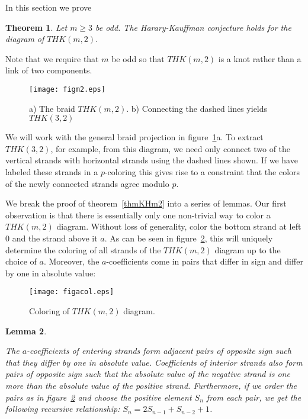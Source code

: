 \documentclass{amsart}
\newtheorem{thm}{Theorem}
\newtheorem{lemma}[thm]{Lemma}
\begin{document}
In this section we  prove

\begin{thm}
Let $m \geq 3$ be odd. The Harary-Kauffman conjecture holds for the diagram of $THK(m,2)$.
\end{thm}

\setcounter{thm}{5}

Note that we require that $m$ be odd so that $THK(m,2)$ is a knot rather than a link of two components.

\begin{figure}[ht]
\begin{center}
\texttt{[image: figm2.eps]}
\caption{a) The braid $THK(m,2)$. b) Connecting the dashed lines yields $THK(3,2)$}\label{figm2}
\end{center}
\end{figure} 

We will work with the general braid projection in figure~\ref{figm2}a.  To extract $THK(3,2)$, for example,  from this diagram, we need only connect two of the vertical strands with horizontal strands using the dashed lines shown.  If we have labeled these strands in a $p$-coloring this gives rise to a constraint that the colors of the newly connected strands agree modulo $p$.

We break the proof of theorem~\ref{thmKHm2} into a series of lemmas.
Our first observation is that there is essentially only one non-trivial way to color a $THK(m,2)$ diagram.
Without loss of generality, color the bottom strand at left $0$ and 
the strand above it $a$. As can be seen in figure~\ref{figacol}, 
this will uniquely determine the coloring of all
strands of the $THK(m,2)$ diagram up to the choice of $a$.
Moreover,
the $a$-coefficients come in pairs that differ in sign and 
differ by one in absolute value:

\begin{figure}[ht]
\begin{center}
\texttt{[image: figacol.eps]}
\caption{Coloring of $THK(m,2)$ diagram.}\label{figacol}
\end{center}
\end{figure} 

\begin{lemma} \label{lemSn}

The $a$-coefficients of entering strands form adjacent pairs of opposite sign such that they differ by one in absolute value.  Coefficients of interior strands also form pairs of opposite sign such that the absolute value of the negative strand is one more than the absolute value of the positive strand. Furthermore, if we order the pairs as in figure~\ref{figacol} and choose the positive element $S_n$ from each pair, we get the following recursive relationship: $S_{n}=2S_{n-1}+S_{n-2}+1$.

\end{lemma}
\end{document}
